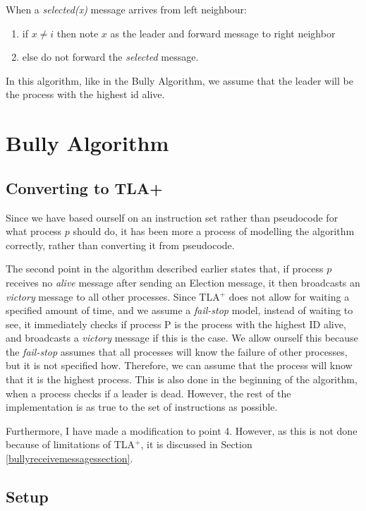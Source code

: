 \documentclass{report}
\begin{document}
\noindent
When a \textit{selected(x)} message arrives from left neighbour:
\begin{enumerate}
  \item if $x \neq i$ then note $x$ as the leader and forward message to right neighbor
        \item else do not forward the \textit{selected} message.
\end{enumerate}

In this algorithm, like in the Bully Algorithm, we assume that the leader will be the process with the highest id alive.

\chapter{Bully Algorithm}

\section{Converting to TLA+}
Since we have based ourself on an instruction set rather than pseudocode for what process $p$ should do, it has been more a process of modelling the algorithm correctly, rather than converting it from pseudocode.

The second point in the algorithm described earlier states that, if process $p$ receives no \textit{alive} message after sending an Election message, it then broadcasts an \textit{victory} message to all other processes. Since TLA$^{+}$ does not allow for waiting a specified amount of time, and we assume a \textit{fail-stop} model, instead of waiting to see, it immediately checks if process P is the process with the highest ID alive, and broadcasts a \textit{victory} message if this is the case. We allow ourself this because the \textit{fail-stop} assumes that all processes will know the failure of other processes, but it is not specified how. Therefore, we can assume that the process will know that it is the highest process. This is also done in the beginning of the algorithm, when a process checks if a leader is dead. However, the rest of the implementation is as true to the set of instructions as possible.

Furthermore, I have made a modification to point 4. However, as this is not done because of limitations of TLA$^{+}$, it is discussed in Section \ref{bullyreceivemessagessection}.
\section{Setup}
\end{document}
